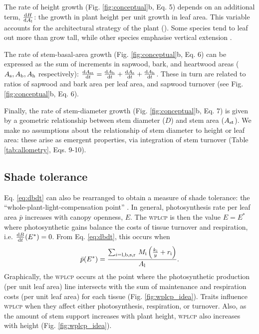 \documentclass[9pt,twocolumn,twoside,lineno]{pnas-new}
\newcommand{\wplcp}{\textsc{wplcp}}
\begin{document}
The rate of height growth (Fig. \ref{fig:conceptual}b, Eq. {\color{pnasbluetext}5}) depends on an additional term, $\frac{{\rm d}H }{{\rm d}A_{\rm l}}$: the growth in plant height per unit growth in leaf area. This variable accounts for the architectural strategy of the plant (\citep{Falster-2011}). Some species tend to leaf out more than grow tall, while other species emphasise vertical extension \citep{Poorter-2006}.

The rate of stem-basal-area growth (Fig. \ref{fig:conceptual}b, Eq. {\color{pnasbluetext}6}) can be expressed as the sum of increments in sapwood, bark, and heartwood areas ($A_{\rm s}, A_{\rm b}, A_{\rm h}$ respectively): $\frac{{\rm d}A_{\rm st}}{{\rm d}t}= \frac{{\rm d}A_{\rm b}}{{\rm d}t} + \frac{{\rm d}A_{\rm s}}{{\rm d}t} + \frac{{\rm d}A_{\rm h}}{{\rm d}t}$. These in turn are related to ratios of sapwood and bark area per leaf area, and sapwood turnover (see Fig. \ref{fig:conceptual}b, Eq. {\color{pnasbluetext}6}).

Finally, the rate of stem-diameter growth (Fig. \ref{fig:conceptual}b, Eq. {\color{pnasbluetext}7}) is given by a geometric relationship between stem diameter ($D$) and stem area ($A_{\rm st}$). We make no assumptions about the relationship of stem diameter to height or leaf area: these arise as emergent properties, via integration of stem turnover (Table \ref{tab:allometry}, Eqs. {\color{pnasbluetext}9}-{\color{pnasbluetext}10}).



\subsection*{Shade tolerance}

Eq. \ref{eq:dbdt} can also be rearranged to obtain a measure of shade tolerance: the ``whole-plant-light-compensation point'' \citep[{\wplcp}][]{Givnish-1988, Baltzer-2007, Lusk-2013} . In general, photosynthesis rate per leaf area $\bar{p}$ increases with canopy openness, $E$. The {\wplcp} is then the value $E=E^*$ where photosynthetic gains balance the costs of tissue turnover and respiration, i.e. $\frac{{\rm d}B}{{\rm d}t}(E^*)=0$. From Eq. \ref{eq:dbdt}, this occurs when
\begin{equation}\label{eq:wplcp}
\bar{p}(E^*) =\frac{\sum_{i={\rm l,b,s,r}} \, M_{\rm i} \left(\frac{k_{\rm i}}{y} + r_{\rm i}\right)}{A_{\rm l}}.
\end{equation}
Graphically, the {\wplcp} occurs at the point where the photosynthetic production (per unit leaf area) line intersects with the sum of maintenance and respiration costs (per unit leaf area) for each tissue (Fig. \ref{fig:wplcp_idea}). Traits influence {\wplcp} when they affect either photosynthesis, respiration, or turnover. Also, as the amount of stem support increases with plant height, {\wplcp} also increases with height \citep{Givnish-1988} (Fig. \ref{fig:wplcp_idea}).
\end{document}
